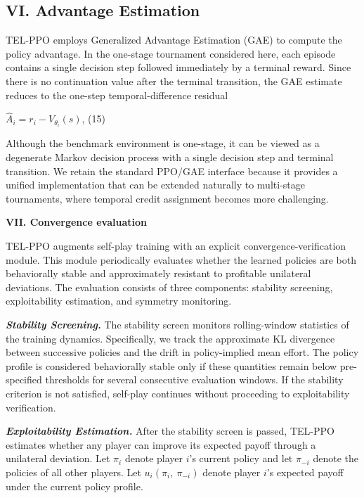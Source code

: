 \documentclass[
]{article}
\begin{document}
\subsection{\texorpdfstring{\textbf{VI. Advantage
Estimation}}{VI. Advantage Estimation}}\label{vi.-advantage-estimation}

TEL-PPO employs Generalized Advantage Estimation (GAE) to compute the
policy advantage. In the one-stage tournament considered here, each
episode contains a single decision step followed immediately by a
terminal reward. Since there is no continuation value after the terminal
transition, the GAE estimate reduces to the one-step temporal-difference
residual

\({\widehat{A}}_{i} = r_{i} - V_{\theta_{i}}(s)\), (15)

Although the benchmark environment is one-stage, it can be viewed as a
degenerate Markov decision process with a single decision step and
terminal transition. We retain the standard PPO/GAE interface because it
provides a unified implementation that can be extended naturally to
multi-stage tournaments, where temporal credit assignment becomes more
challenging.

\textbf{VII. Convergence evaluation}

TEL-PPO augments self-play training with an explicit
convergence-verification module. This module periodically evaluates
whether the learned policies are both behaviorally stable and
approximately resistant to profitable unilateral deviations. The
evaluation consists of three components: stability screening,
exploitability estimation, and symmetry monitoring.

\emph{\textbf{Stability Screening.}} The stability screen monitors
rolling-window statistics of the training dynamics. Specifically, we
track the approximate KL divergence between successive policies and the
drift in policy-implied mean effort. The policy profile is considered
behaviorally stable only if these quantities remain below pre-specified
thresholds for several consecutive evaluation windows. If the stability
criterion is not satisfied, self-play continues without proceeding to
exploitability verification.

\emph{\textbf{Exploitability Estimation.}} After the stability screen is
passed, TEL-PPO estimates whether any player can improve its expected
payoff through a unilateral deviation. Let \(\pi_{i}\) denote player
\(i\)'s current policy and let \(\pi_{- i}\) denote the policies of all
other players. Let \(u_{i}(\pi_{i},{\ \pi}_{- i})\) denote player
\(i\)'s expected payoff under the current policy profile.
\end{document}

